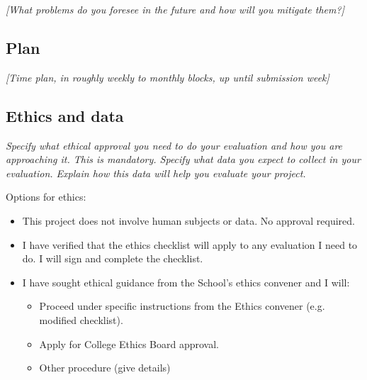 \documentclass[11pt]{article}
\begin{document}
\emph{{[}What problems do you foresee in the future and how will you
mitigate them?{]}}

\subsection{Plan}\label{plan}

\emph{{[}Time plan, in roughly weekly to monthly blocks, up until
submission week{]}}

    
\subsection{Ethics and data}\label{ethics}
\emph{Specify what ethical approval you need to do your evaluation and how you are approaching it. This is mandatory. 
Specify what data you expect to collect in your evaluation. Explain how this data will help you evaluate your project.
}

Options for ethics:
\begin{itemize}
    \item This project does not involve human subjects or data. No approval required.
    \item I have verified that the ethics checklist will apply to any evaluation I need to do. I will sign and complete the checklist.
    \item I have sought ethical guidance from the School's ethics convener and I will:
    \begin{itemize}
        \item Proceed under specific instructions from the Ethics convener (e.g. modified checklist).
        \item Apply for College Ethics Board approval.
        \item Other procedure (give details)
    \end{itemize} 
\end{itemize}

   
\end{document}
